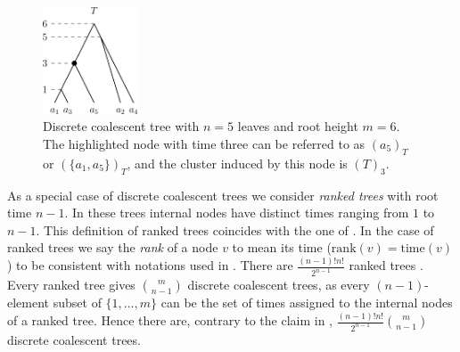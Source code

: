 \documentclass[11pt]{amsart}
\newcommand{\rank}{\mathrm{rank}}
\newcommand{\ntime}{\mathrm{time}}
\begin{document}
\begin{figure}[ht]
	\includegraphics[width=0.25\textwidth]{dtt_tree.eps}
	\caption{Discrete coalescent tree with $n = 5$ leaves and root height $m = 6$.
	The highlighted node with time three can be referred to as $(a_5)_T$ or $(\{a_1,a_5\})_T$, and the cluster induced by this node is $(T)_3$.}
	\label{fig:dtt_tree}
\end{figure}

As a special case of discrete coalescent trees we consider \emph{ranked trees} with root time $n-1$.
In these trees internal nodes have distinct times ranging from $1$ to $n-1$.
This definition of ranked trees coincides with the one of \textcite{Collienne2021}.
In the case of ranked trees we say the \emph{rank} of a node $v$ to mean its time ($\rank(v) = \ntime(v)$) to be consistent with notations used in \autocite{Collienne2021}.
There are $\frac{(n-1)!n!}{2^{n-1}}$ ranked trees \autocite{Semple2003-nj}.
Every ranked tree gives ${m \choose n-1}$ discrete coalescent trees, as every $(n-1)$-element subset of $\{1, \ldots, m\}$ can be the set of times assigned to the internal nodes of a ranked tree.
Hence there are, contrary to the claim in \autocite{Gavryushkin2018-ol}, $\frac{(n-1)!n!}{2^{n-1}} {m \choose n-1}$ discrete coalescent trees.
\end{document}

